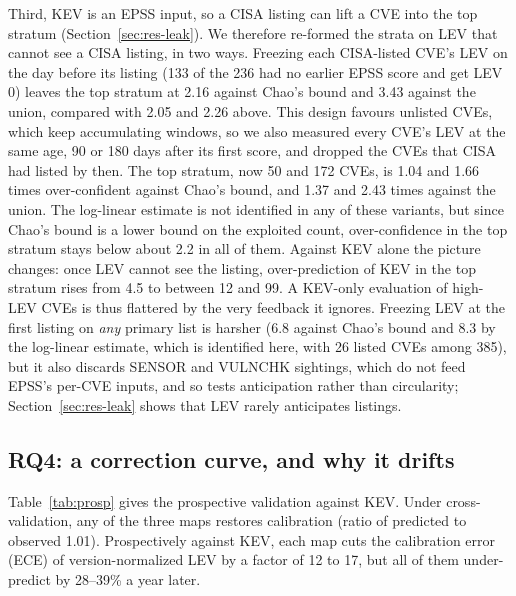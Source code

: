 Third, KEV is an EPSS input, so a CISA listing can lift a CVE into the top
stratum (Section~\ref{sec:res-leak}). We therefore re-formed the strata on LEV
that cannot see a CISA listing, in two ways. Freezing each CISA-listed CVE's LEV
on the day before its listing (133 of the 236 had no earlier EPSS score and get
LEV 0) leaves the top stratum at 2.16 against Chao's bound and 3.43 against the
union, compared with 2.05 and 2.26 above. This design favours unlisted CVEs,
which keep accumulating windows, so we also measured every CVE's LEV at the
same age, 90 or 180 days after its first score, and dropped the CVEs that CISA
had listed by then. The top stratum, now 50 and 172 CVEs, is 1.04 and 1.66
times over-confident against Chao's bound, and 1.37 and 2.43 times against the
union. The log-linear estimate is not identified in any of these variants, but
since Chao's bound is a lower bound on the exploited count, over-confidence in
the top stratum stays below about 2.2 in all of them. Against KEV alone the
picture changes: once LEV cannot see the listing, over-prediction of KEV in the
top stratum rises from 4.5 to between 12 and 99. A KEV-only evaluation of
high-LEV CVEs is thus flattered by the very feedback it ignores. Freezing LEV
at the first listing on \emph{any} primary list is harsher (6.8 against Chao's
bound and 8.3 by the log-linear estimate, which is identified here, with 26
listed CVEs among 385), but it also discards SENSOR and VULNCHK
sightings, which do not feed EPSS's per-CVE inputs, and so tests anticipation
rather than circularity; Section~\ref{sec:res-leak} shows that LEV rarely
anticipates listings.


\subsection{RQ4: a correction curve, and why it drifts}\label{sec:res-correct}

Table~\ref{tab:prosp} gives the prospective validation against KEV. Under
cross-validation, any of the three maps restores calibration (ratio of
predicted to observed 1.01). Prospectively against KEV, each map cuts the
calibration error (ECE) of version-normalized LEV by a factor of 12 to 17, but all of them under-predict by
28--39\% a year later.

